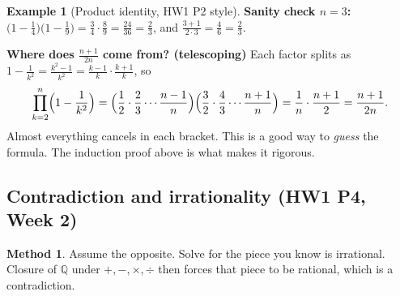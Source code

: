\documentclass[11pt]{article}
\theoremstyle{definition}
\newtheorem{ex}[defn]{Example}
\newtheorem{method}[defn]{Method}
\newcommand{\Q}{\mathbb{Q}}
\newcommand{\key}[1]{\textcolor{red!70!black}{\textbf{#1}}}
\begin{document}
\begin{ex}[Product identity, HW1 P2 style]
\noindent\key{Sanity check $n=3$:}
$\bigl(1-\frac14\bigr)\bigl(1-\frac19\bigr)=\frac34\cdot\frac89=\frac{24}{36}=\frac23$,
and $\frac{3+1}{2\cdot3}=\frac46=\frac23$. \checkmark

\noindent\key{Where does $\frac{n+1}{2n}$ come from? (telescoping)}
Each factor splits as
$1-\frac1{k^2}=\frac{k^2-1}{k^2}=\frac{k-1}{k}\cdot\frac{k+1}{k}$, so
\[
\prod_{k=2}^{n}\Bigl(1-\frac1{k^2}\Bigr)
=\Bigl(\frac12\cdot\frac23\cdots\frac{n-1}{n}\Bigr)
\Bigl(\frac32\cdot\frac43\cdots\frac{n+1}{n}\Bigr)
=\frac1n\cdot\frac{n+1}2=\frac{n+1}{2n}.
\]
Almost everything cancels in each bracket. This is a good way to
\emph{guess} the formula. The induction proof above is what makes it
rigorous.
\end{ex}

\subsection{Contradiction and irrationality (HW1 P4, Week 2)}
\begin{method}
Assume the opposite. Solve for the piece you know is irrational. Closure
of $\Q$ under $+,-,\times,\div$ then forces that piece to be rational,
which is a contradiction.
\end{method}
\end{document}
